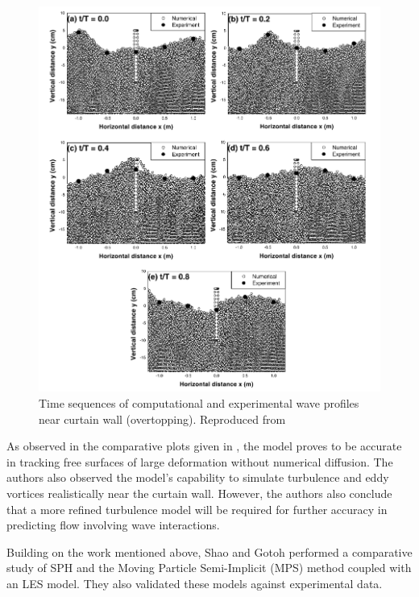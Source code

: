 \begin{figure}[H]
    \centering
    \includegraphics[scale=0.8]{Figures/research_papers/gotoh2004-wave-profile-result.png}
    \caption{Time sequences of computational and experimental wave profiles near curtain wall (overtopping). Reproduced from \cite{Gotoh2004}}
    \label{fig:gotoh2004-wave-profile-result}
\end{figure}

As observed in the comparative plots given in , the model proves to be accurate in tracking free surfaces of large deformation without numerical diffusion. The authors also observed the model’s capability to simulate turbulence and eddy vortices realistically near the curtain wall. However, the authors also conclude that a more refined turbulence model will be required for further accuracy in predicting flow involving wave interactions.

Building on the work mentioned above, Shao and Gotoh \parencite{Shao2005} performed a comparative study of SPH and the Moving Particle Semi-Implicit (MPS) method coupled with an LES model. They also validated these models against experimental data.

